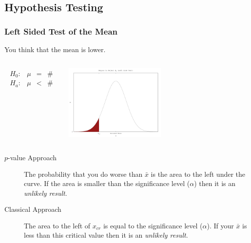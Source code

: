 \subsection{Hypothesis Testing}

\begin{frame}
  \frametitle{Left Sided Test of the Mean}

  You think that the mean is lower.

  \begin{columns}
    \begin{eqnarray*}
      \begin{array}{lrcl}
        H_0: & \mu & = & \# \\
        H_a: & \mu & < & \#
      \end{array}
    \end{eqnarray*}


    \includegraphics[width=5cm]{img/leftSideHypothesisTest}

  \end{columns}

  \begin{description}
  \item[$p$-value Approach] The probability that you do worse than
    $\bar{x}$ is the area to the left under the curve. If the area is
    smaller than the significance level ($\alpha$) then it is an
    \textit{unlikely result}.
  \item[Classical Approach] The area to the left of $x_{cr}$ is
    equal to the significance level ($\alpha$). If your $\bar{x}$ is
    less than this critical value then it is an \textit{unlikely
      result}.
  \end{description}


\end{frame}

